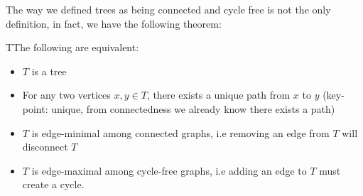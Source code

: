 \newpage
\noindent The way we defined trees as being connected and cycle free is not the only definition, in fact, we have the following theorem:
\par\bigskip
\begin{theo}
  TThe following are equivalent:\par
  \begin{itemize}
    \item $T$ is a tree
    \item For any two vertices $x,y\in T$, there exists a unique path from $x$ to $y$ (key-point: unique, from connectedness we already know there exists a path)
    \item $T$ is edge-minimal among connected graphs, i.e removing an edge from $T$ will disconnect $T$
    \item $T$ is edge-maximal among cycle-free graphs, i.e adding an edge to $T$ must create a cycle.
  \end{itemize}
\end{theo}
\par\bigskip
